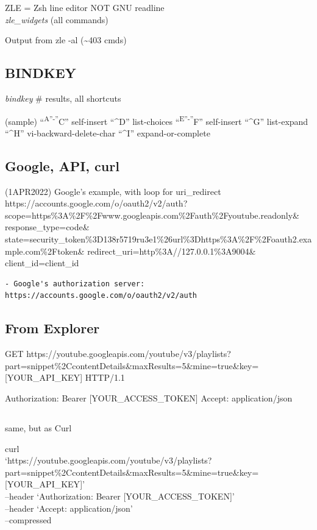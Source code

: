 \documentclass[
]{report}
\begin{document}
ZLE = Zsh line editor \textbar{} NOT GNU readline\\
\emph{zle\_widgets} (all commands)

Output from zle -al (\textasciitilde403 cmds)

\subsection{BINDKEY}\label{bindkey}

\emph{bindkey} \# results, all shortcuts

(sample) ``\textsuperscript{A''-''}C'' self-insert ``\^{}D''
list-choices ``\textsuperscript{E''-''}F'' self-insert ``\^{}G''
list-expand ``\^{}H'' vi-backward-delete-char ``\^{}I''
expand-or-complete

\subsection{Google, API, curl}\label{google-api-curl}

(1APR2022) Google's example, with loop for uri\_redirect
https://accounts.google.com/o/oauth2/v2/auth?
scope=https\%3A\%2F\%2Fwww.googleapis.com\%2Fauth\%2Fyoutube.readonly\&
response\_type=code\&
state=security\_token\%3D138r5719ru3e1\%26url\%3Dhttps\%3A\%2F\%2Foauth2.example.com\%2Ftoken\&
redirect\_uri=http\%3A//127.0.0.1\%3A9004\& client\_id=client\_id

\begin{verbatim}
- Google's authorization server: https://accounts.google.com/o/oauth2/v2/auth
\end{verbatim}

\subsection{From Explorer}\label{from-explorer}

GET
https://youtube.googleapis.com/youtube/v3/playlists?part=snippet\%2CcontentDetails\&maxResults=5\&mine=true\&key={[}YOUR\_API\_KEY{]}
HTTP/1.1

Authorization: Bearer {[}YOUR\_ACCESS\_TOKEN{]} Accept: application/json

\subsection{}\label{section}

same, but as Curl

curl\\
`https://youtube.googleapis.com/youtube/v3/playlists?part=snippet\%2CcontentDetails\&maxResults=5\&mine=true\&key={[}YOUR\_API\_KEY{]}'\\
--header `Authorization: Bearer {[}YOUR\_ACCESS\_TOKEN{]}'\\
--header `Accept: application/json'\\
--compressed
\end{document}
